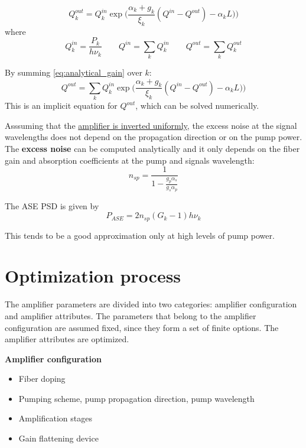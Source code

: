 \documentclass[a4paper]{article}
\begin{document}
\begin{equation} \label{eq:analytical_gain}
	Q^{out}_k = Q^{in}_k\exp\Big(\frac{\alpha_k + g_k}{\xi_k}(Q^{in} - Q^{out}) - \alpha_kL)\Big)
\end{equation}
where
\begin{equation}
	Q^{in}_k = \frac{P_k}{h\nu_k}\qquad Q^{in} = \sum_k Q^{in}_k \qquad Q^{out} = \sum_k Q^{out}_k
\end{equation}

By summing \eqref{eq:analytical_gain} over $k$:
\begin{equation}
Q^{out} = \sum_kQ^{in}_k\exp\Big(\frac{\alpha_k + g_k}{\xi_k}(Q^{in} - Q^{out}) - \alpha_kL)\Big)
\end{equation}
This is an implicit equation for $Q^{out}$, which can be solved numerically. 

Asssuming that the \underline{amplifier is inverted uniformly}, the excess noise at the signal wavelengths does not depend on the propagation direction or on the pump power. The \textbf{excess noise} can be computed analytically and it only depends on the fiber gain and absorption coefficients at the pump and signals wavelength:
\begin{equation}
	n_{sp} = \frac{1}{1 - \displaystyle\frac{g_p\alpha_s}{g_s\alpha_p}}
\end{equation}

The ASE PSD is given by
\begin{equation}
	P_{ASE} = 2n_{sp}(G_k-1)h\nu_k
\end{equation}

This tends to be a good approximation only at high levels of pump power.

\section{Optimization process}

The amplifier parameters are divided into two categories: amplifier configuration and amplifier attributes. The parameters that belong to the amplifier configuration are assumed fixed, since they form a set of finite options. The amplifier attributes are optimized.

\noindent\textbf{Amplifier configuration}
\begin{itemize}
	\item Fiber doping
	\item Pumping scheme, pump propagation direction, pump wavelength
	\item Amplification stages
	\item Gain flattening device
\end{itemize}
\end{document}
